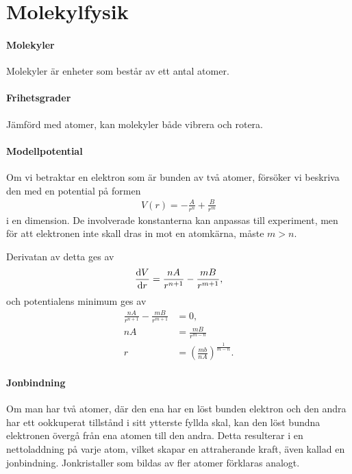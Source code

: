 \section{Molekylfysik}

\paragraph{Molekyler}
Molekyler är enheter som består av ett antal atomer.

\paragraph{Frihetsgrader}
Jämförd med atomer, kan molekyler både vibrera och rotera.

\paragraph{Modellpotential}
Om vi betraktar en elektron som är bunden av två atomer, försöker vi beskriva den med en potential på formen
\begin{align*}
	V(r) = -\frac{A}{r^{n}} + \frac{B}{r^{m}}
\end{align*}
i en dimension. De involverade konstanterna kan anpassas till experiment, men för att elektronen inte skall dras in mot en atomkärna, måste $m > n$.

Derivatan av detta ges av
\begin{align*}
	\dv{V}{r} = \frac{nA}{r^{n + 1}} - \frac{mB}{r^{m + 1}},
\end{align*}
och potentialens minimum ges av
\begin{align*}
	\frac{nA}{r^{n + 1}} - \frac{mB}{r^{m + 1}} &= 0, \\
	nA                                          &= \frac{mB}{r^{m - n}} \\
	r                                           &= \left(\frac{mb}{nA}\right)^{\frac{1}{m - n}}.
\end{align*}

\paragraph{Jonbindning}
Om man har två atomer, där den ena har en löst bunden elektron och den andra har ett ookkuperat tillstånd i sitt ytterste fyllda skal, kan den löst bundna elektronen övergå från ena atomen till den andra. Detta resulterar i en nettoladdning på varje atom, vilket skapar en attraherande kraft, även kallad en jonbindning. Jonkristaller som bildas av fler atomer förklaras analogt.

